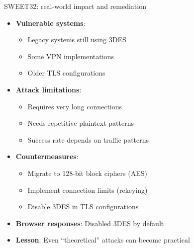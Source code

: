 \ifdefined\PRESENTATION\else\PassOptionsToClass{handout}{beamer}\fi\documentclass[aspectratio=169, lualatex]{beamer}
\begin{document}
\begin{frame}{SWEET32: real-world impact and remediation}
	\begin{itemize}
		\item \textbf{Vulnerable systems}:
		      \begin{itemize}
			      \item Legacy systems still using 3DES
			      \item Some VPN implementations
			      \item Older TLS configurations
		      \end{itemize}
		\item \textbf{Attack limitations}:
		      \begin{itemize}
			      \item Requires very long connections
			      \item Needs repetitive plaintext patterns
			      \item Success rate depends on traffic patterns
		      \end{itemize}
		\item \textbf{Countermeasures}:
		      \begin{itemize}
			      \item Migrate to 128-bit block ciphers (AES)
			      \item Implement connection limits (rekeying)
			      \item Disable 3DES in TLS configurations
		      \end{itemize}
		\item \textbf{Browser responses}: Disabled 3DES by default
		\item \textbf{Lesson}: Even ``theoretical'' attacks can become practical
	\end{itemize}
\end{frame}
\end{document}
